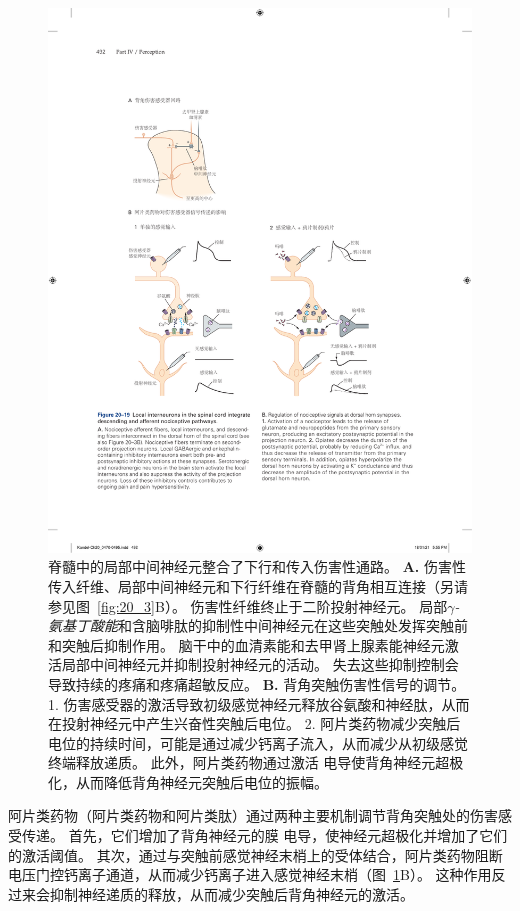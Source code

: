 \begin{figure}[htbp]
	\centering
	\includegraphics[width=1.0\linewidth]{chap20/fig_20_19}
	\caption{脊髓中的局部中间神经元整合了下行和传入伤害性通路。
		\textbf{A.} 伤害性传入纤维、局部中间神经元和下行纤维在脊髓的背角相互连接（另请参见图~\ref{fig:20_3}B）。
		伤害性纤维终止于二阶投射神经元。
		局部\textit{$\gamma$-氨基丁酸能}和含脑啡肽的抑制性中间神经元在这些突触处发挥突触前和突触后抑制作用。
		脑干中的血清素能和去甲肾上腺素能神经元激活局部中间神经元并抑制投射神经元的活动。
		失去这些抑制控制会导致持续的疼痛和疼痛超敏反应。
		\textbf{B.} 背角突触伤害性信号的调节。
		1. 伤害感受器的激活导致初级感觉神经元释放谷氨酸和神经肽，从而在投射神经元中产生兴奋性突触后电位。
		2. 阿片类药物减少突触后电位的持续时间，可能是通过减少钙离子流入，从而减少从初级感觉终端释放递质。
		此外，阿片类药物通过激活  电导使背角神经元超极化，从而降低背角神经元突触后电位的振幅。}
	\label{fig:20_19}
\end{figure}


阿片类药物（阿片类药物和阿片类肽）通过两种主要机制调节背角突触处的伤害感受传递。
首先，它们增加了背角神经元的膜  电导，使神经元超极化并增加了它们的激活阈值。
其次，通过与突触前感觉神经末梢上的受体结合，阿片类药物阻断电压门控钙离子通道，从而减少钙离子进入感觉神经末梢（图~\ref{fig:20_19}B）。
这种作用反过来会抑制神经递质的释放，从而减少突触后背角神经元的激活。


